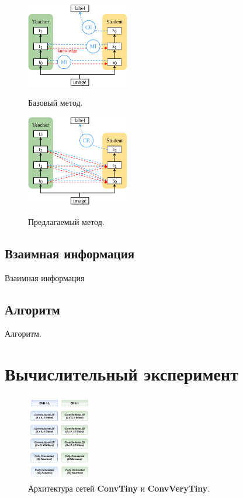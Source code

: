 \documentclass[14]{article}
\begin{document}
\begin{figure}[h]
  \begin{multicols}{2}
    \hfill
    \includegraphics[width=0.4\textwidth]{../figures/ahn_diagram.pdf}
    \hfill
    \caption{Базовый метод.}
    \label{ris:ahn_diagram}
    \hfill
    \includegraphics[width=0.4\textwidth]{../figures/our_diagram.pdf}
    \hfill
    \caption{Предлагаемый метод.}
    \label{ris:our_diagram}
  \end{multicols}
\end{figure}

\subsection{Взаимная информация}
Взаимная информация

\subsection{Алгоритм}
Алгоритм.
\section{Вычислительный эксперимент}

\begin{figure}
  \begin{center}
    \includegraphics[width=0.25\textwidth]{../figures/conv_scheme.png}
  \end{center}
  \caption{Архитектура сетей \textbf{ConvTiny} и \textbf{ConvVeryTiny}.}
  \label{ris:conv_architecture}
\end{figure}
\end{document}
